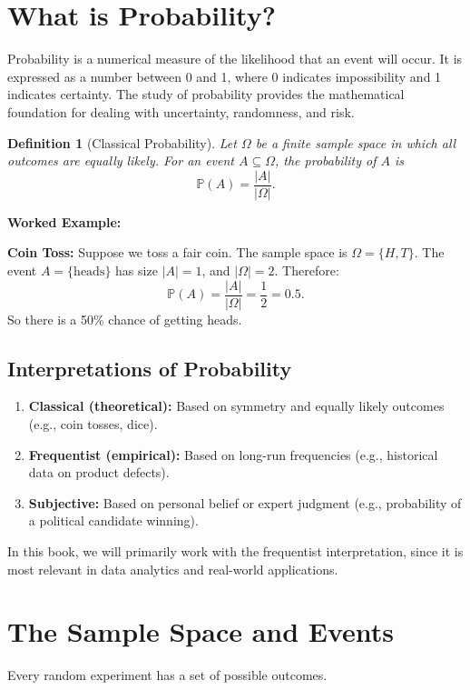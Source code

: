 \documentclass[12pt,a4paper,oneside]{report}
\theoremstyle{mytheorem}
\theoremstyle{mydefinition}
\newtheorem{definition}[theorem]{Definition}
\theoremstyle{myremark}
\newenvironment{worked}{%
  \par\medskip\noindent\textbf{\color{myorange}Worked Example:}\par\smallskip
}{%
  \par\medskip
}
\newcommand{\Prob}{\mathbb{P}}
\begin{document}
\section{What is Probability?}
Probability is a numerical measure of the likelihood that an event will occur. It is expressed as a number between 0 and 1, where 0 indicates impossibility and 1 indicates certainty. The study of probability provides the mathematical foundation for dealing with uncertainty, randomness, and risk.

\begin{definition}[Classical Probability]
Let $\Omega$ be a finite sample space in which all outcomes are equally likely. For an event $A \subseteq \Omega$, the probability of $A$ is
\[
\Prob(A) = \frac{|A|}{|\Omega|}.
\]
\end{definition}

\begin{worked}
\textbf{Coin Toss:}
Suppose we toss a fair coin. The sample space is $\Omega = \{H, T\}$. The event $A = \{\text{heads}\}$ has size $|A| = 1$, and $|\Omega| = 2$. Therefore:
\[
\Prob(A) = \frac{|A|}{|\Omega|} = \frac{1}{2} = 0.5.
\]
So there is a 50\% chance of getting heads.
\end{worked}

\subsection{Interpretations of Probability}
\begin{enumerate}
    \item \textbf{Classical (theoretical):} Based on symmetry and equally likely outcomes (e.g., coin tosses, dice).
    \item \textbf{Frequentist (empirical):} Based on long-run frequencies (e.g., historical data on product defects).
    \item \textbf{Subjective:} Based on personal belief or expert judgment (e.g., probability of a political candidate winning).
\end{enumerate}
In this book, we will primarily work with the frequentist interpretation, since it is most relevant in data analytics and real-world applications.

\section{The Sample Space and Events}
Every random experiment has a set of possible outcomes.
\end{document}

